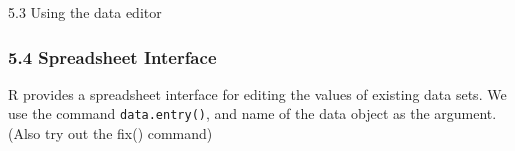 \documentclass{beamer}
\begin{document}
 	\begin{frame}
 		5.3 Using the data editor
 		
 	\end{frame}
 	\begin{frame}
 		\frametitle{5.4 Spreadsheet Interface}
 		R provides a spreadsheet interface for editing the values of existing data sets. We use the
 		command \texttt{data.entry()}, and name of the data object as the argument. (Also try out the
 		fix() command)
 		
 	\end{frame}
 	
 	
 	
 	
 	
 
\end{document}
